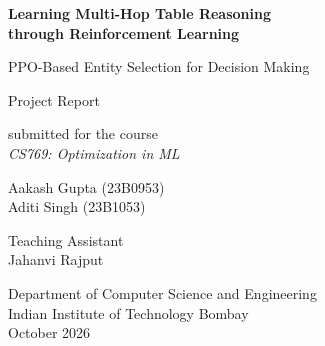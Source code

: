 \documentclass[11pt,a4paper,oneside]{report}
\newcommand{\ReportAuthors}{Aakash Gupta (23B0953)\\Aditi Singh (23B1053)}
\newcommand{\ReportCourse}{CS769: Optimization in ML}
\newcommand{\ReportGuide}{Jahanvi Rajput}
\newcommand{\ReportDept}{Department of Computer Science and Engineering}
\newcommand{\ReportInstitute}{Indian Institute of Technology Bombay}
\newcommand{\ReportDate}{October 2026}
\theoremstyle{plain}
\theoremstyle{definition}
\theoremstyle{remark}
\begin{document}
\begin{titlepage}
  \centering
  \vspace*{1.2cm}
  {\LARGE\bfseries Learning Multi-Hop Table Reasoning\\[4pt] through Reinforcement Learning\par}
  \vspace{0.5cm}
  {\Large PPO-Based Entity Selection for Decision Making\par}
  \vspace{1.2cm}
  {\large Project Report\par}
  \vspace{0.3cm}
  {\normalsize submitted for the course\\ \emph{\ReportCourse}\par}
  \vspace{1.5cm}
  {\large \ReportAuthors\par}
  \vspace{1.2cm}
  {\normalsize Teaching Assistant\\ \ReportGuide\par}
  \vfill
  {\normalsize \ReportDept\\ \ReportInstitute\\[6pt] \ReportDate\par}
\end{titlepage}


\tableofcontents
\listoffigures
\listoftables
\clearpage
{}
















\appendix

\end{document}
